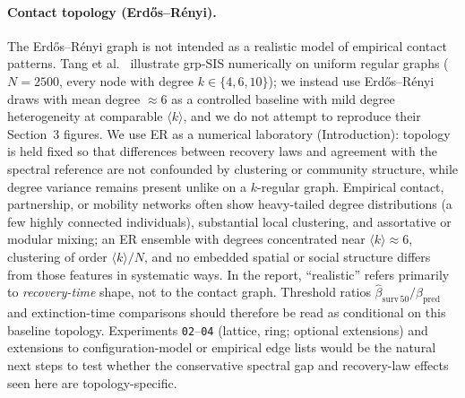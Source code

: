 \documentclass[11pt,a4paper]{article}
\begin{document}
\paragraph{Contact topology (Erd\H{o}s--R\'enyi).}
\label{par:er-topology}
The Erd\H{o}s--R\'enyi graph is not intended as a realistic model of empirical contact patterns. Tang et al.\ \cite{Tang2025} illustrate grp-SIS numerically on uniform regular graphs ($N{=}2500$, every node with degree $k\in\{4,6,10\}$); we instead use Erd\H{o}s--R\'enyi draws with mean degree $\approx 6$ as a controlled baseline with mild degree heterogeneity at comparable $\langle k\rangle$, and we do not attempt to reproduce their Section~3 figures. We use ER as a numerical laboratory (Introduction): topology is held fixed so that differences between recovery laws and agreement with the spectral reference are not confounded by clustering or community structure, while degree variance remains present unlike on a $k$-regular graph. Empirical contact, partnership, or mobility networks often show heavy-tailed degree distributions (a few highly connected individuals), substantial local clustering, and assortative or modular mixing; an ER ensemble with degrees concentrated near $\langle k\rangle\approx 6$, clustering of order $\langle k\rangle/N$, and no embedded spatial or social structure differs from those features in systematic ways. In the report, ``realistic'' refers primarily to \emph{recovery-time} shape, not to the contact graph. Threshold ratios $\hat{\beta}_{\mathrm{surv}\,50}/\beta_{\mathrm{pred}}$ and extinction-time comparisons should therefore be read as conditional on this baseline topology. Experiments \texttt{02}--\texttt{04} (lattice, ring; optional extensions) and extensions to configuration-model or empirical edge lists would be the natural next steps to test whether the conservative spectral gap and recovery-law effects seen here are topology-specific.
\end{document}
